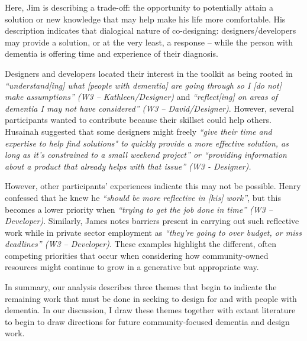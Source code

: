 Here, Jim is describing a trade-off: the opportunity to potentially attain a solution or new knowledge that may help make his life more comfortable. His description indicates that dialogical nature of co-designing: designers/developers may provide a solution, or at the very least, a response – while the person with dementia is offering time and experience of their diagnosis. 

Designers and developers located their interest in the toolkit as being rooted in \textit{``understand[ing] what [people with dementia] are going through so I [do not] make assumptions'' (W3 – Kathleen/Designer)} and \textit{``reflect[ing] on areas of dementia I may not have considered'' (W3 – David/Designer)}. However, several participants wanted to contribute because their skillset could help others. Husainah suggested that some designers might freely \textit{``give their time and expertise to help find solutions" to quickly provide a more effective solution, as long as it’s constrained to a small weekend project'' or ``providing information about a product that already helps with that issue'' (W3 - Designer).}

However, other participants’ experiences indicate this may not be possible. Henry confessed that he knew he \textit{``should be more reflective in [his] work''}, but this becomes a lower priority when \textit{``trying to get the job done in time'' (W3 – Developer)}. Similarly, James notes barriers present in carrying out such reflective work while in private sector employment as \textit{``they're going to over budget, or miss deadlines'' (W3 – Developer)}. These examples highlight the different, often competing priorities that occur when considering how community-owned resources might continue to grow in a generative but appropriate way.

In summary, our analysis describes three themes that begin to indicate the remaining work that must be done in seeking to design for and with people with dementia. In our discussion, I draw these themes together with extant literature to begin to draw directions for future community-focused dementia and design work.
